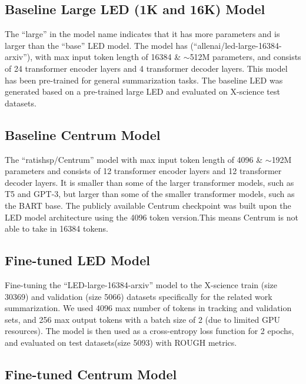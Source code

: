\documentclass[12pt, twocolumn]{article}
\numberwithin{equation}{section}
\begin{document}
\subsection{Baseline Large LED (1K and 16K) Model}
\label{app:model-large-led}

The ``large'' in the model name indicates that it has more parameters and is larger than the ``base'' LED model. The model has (``allenai/led-large-16384-arxiv''), with max input token length of 16384 \& $\sim$512M parameters, and consists of 24 transformer encoder layers and 4 transformer decoder layers. This model has been pre-trained for general summarization tasks. The baseline LED was generated based on a pre-trained large LED and evaluated on X-science test datasets.

\subsection{Baseline Centrum Model}
\label{app:model-centrum}

The ``ratishsp/Centrum'' model with max input token length of 4096 \& $\sim$192M parameters and consists of 12 transformer encoder layers and 12 transformer decoder layers. It is smaller than some of the larger transformer models, such as T5 and GPT-3, but larger than some of the smaller transformer models, such as the BART base. The publicly available Centrum checkpoint was built upon the LED model architecture using the 4096 token version.This means Centrum is not able to take in 16384 tokens.

\subsection{Fine-tuned LED Model}
\label{app:model-ft-led}

Fine-tuning the ``LED-large-16384-arxiv'' model to the X-science train (size 30369) and validation (size 5066) datasets specifically for the related work summarization. We used 4096 max number of tokens in tracking and validation sets, and 256 max output tokens with a batch size of 2 (due to limited GPU resources). The model is then used as a cross-entropy loss function for 2 epochs, and evaluated on test datasets(size 5093) with ROUGH metrics. 

\subsection{Fine-tuned Centrum Model}
\label{app:model-ft-centrum}
\end{document}
